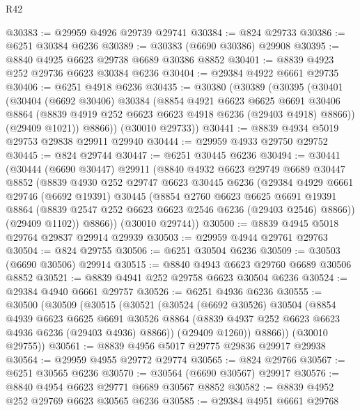 \begin{lexlean}{R42}
\begin{coremodule}
{@30383 := @29959 @4926 @29739 @29741
@30384 := @824 @29733
@30386 := @6251 @30384 @6236
@30389 := @30383 (@6690 @30386) @29908
@30395 := @8840 @4925 @6623 @29738 @6689 @30386 @8852
@30401 := @8839 @4923 @252 @29736 @6623 @30384 @6236
@30404 := @29384 @4922 @6661 @29735
@30406 := @6251 @4918 @6236
@30435 := @30380
    (@30389
      (@30395
        (@30401
          (@30404
            (@6692 @30406)
            @30384
            (@8854
              @4921
              @6623
              @6625
              @6691
              @30406
              @8864
              (@8839 @4919 @252 @6623 @6623 @4918 @6236 (@29403 @4918) @8866))
            (@29409 @1021))
          @8866))
      (@30010 @29733))
@30441 := @8839 @4934 @5019 @29753 @29838 @29911 @29940
@30444 := @29959 @4933 @29750 @29752
@30445 := @824 @29744
@30447 := @6251 @30445 @6236
@30494 := @30441
    (@30444
      (@6690 @30447)
      @29911
      (@8840
        @4932
        @6623
        @29749
        @6689
        @30447
        @8852
        (@8839
          @4930
          @252
          @29747
          @6623
          @30445
          @6236
          (@29384
            @4929
            @6661
            @29746
            (@6692 @19391)
            @30445
            (@8854
              @2760
              @6623
              @6625
              @6691
              @19391
              @8864
              (@8839 @2547 @252 @6623 @6623 @2546 @6236 (@29403 @2546) @8866))
            (@29409 @1102))
          @8866))
      (@30010 @29744))
@30500 := @8839 @4945 @5018 @29764 @29837 @29914 @29939
@30503 := @29959 @4944 @29761 @29763
@30504 := @824 @29755
@30506 := @6251 @30504 @6236
@30509 := @30503 (@6690 @30506) @29914
@30515 := @8840 @4943 @6623 @29760 @6689 @30506 @8852
@30521 := @8839 @4941 @252 @29758 @6623 @30504 @6236
@30524 := @29384 @4940 @6661 @29757
@30526 := @6251 @4936 @6236
@30555 := @30500
    (@30509
      (@30515
        (@30521
          (@30524
            (@6692 @30526)
            @30504
            (@8854
              @4939
              @6623
              @6625
              @6691
              @30526
              @8864
              (@8839 @4937 @252 @6623 @6623 @4936 @6236 (@29403 @4936) @8866))
            (@29409 @1260))
          @8866))
      (@30010 @29755))
@30561 := @8839 @4956 @5017 @29775 @29836 @29917 @29938
@30564 := @29959 @4955 @29772 @29774
@30565 := @824 @29766
@30567 := @6251 @30565 @6236
@30570 := @30564 (@6690 @30567) @29917
@30576 := @8840 @4954 @6623 @29771 @6689 @30567 @8852
@30582 := @8839 @4952 @252 @29769 @6623 @30565 @6236
@30585 := @29384 @4951 @6661 @29768
}
\end{coremodule}
\end{lexlean}

